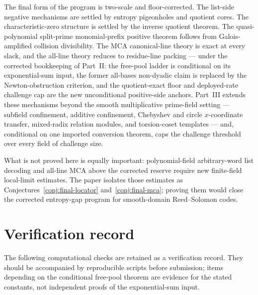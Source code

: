 \documentclass[11pt]{article}
\theoremstyle{definition}
\begin{document}
The final form of the program is two-scale and floor-corrected.  The list-side negative mechanisms are settled by entropy pigeonholes and quotient cores.  The characteristic-zero structure is settled by the inverse quotient theorem.  The quasi-polynomial split-prime monomial-prefix positive theorem follows from Galois-amplified collision divisibility.  The MCA canonical-line theory is exact at every slack, and the all-line theory reduces to residue-line packing --- under the corrected bookkeeping of Part~II: the free-pool ladder is conditional on its exponential-sum input, the former all-bases non-dyadic claim is replaced by the Newton-obstruction criterion, and the quotient-exact floor and deployed-rate challenge cap are the new unconditional positive-side anchors.  Part~III extends these mechanisms beyond the smooth multiplicative prime-field setting --- subfield confinement, additive confinement, Chebyshev and circle $x$-coordinate transfer, mixed-radix relation modules, and torsion-coset templates --- and, conditional on one imported conversion theorem, caps the challenge threshold over every field of challenge size.

What is not proved here is equally important: polynomial-field arbitrary-word list decoding and all-line MCA above the corrected reserve require new finite-field local-limit estimates.  The paper isolates those estimates as Conjectures~\ref{conj:final-locator} and~\ref{conj:final-mca}; proving them would close the corrected entropy-gap program for smooth-domain Reed--Solomon codes.


\appendix

\section{Verification record}\label{app:verify}

The following computational checks are retained as a verification record.  They should be accompanied by reproducible scripts before submission; items depending on the conditional free-pool theorem are evidence for the stated constants, not independent proofs of the exponential-sum input.
\end{document}
